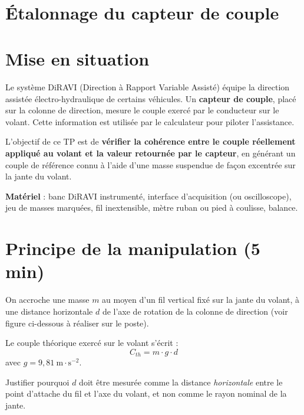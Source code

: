 



\\

\legendeniveaux


\section{Étalonnage du capteur de couple}

\section*{Mise en situation}
 
Le système DiRAVI (Direction à Rapport Variable Assisté) équipe la direction assistée électro-hydraulique de certains véhicules. Un \textbf{capteur de couple}, placé sur la colonne de direction, mesure le couple exercé par le conducteur sur le volant. Cette information est utilisée par le calculateur pour piloter l'assistance.
 
L'objectif de ce TP est de \textbf{vérifier la cohérence entre le couple réellement appliqué au volant et la valeur retournée par le capteur}, en générant un couple de référence connu à l'aide d'une masse suspendue de façon excentrée sur la jante du volant.
 
\vspace{0.5em}
\textbf{Matériel} : banc DiRAVI instrumenté, interface d'acquisition (ou oscilloscope), jeu de masses marquées, fil inextensible, mètre ruban ou pied à coulisse, balance.
 
\section{Principe de la manipulation (5 min)}
 
On accroche une masse $m$ au moyen d'un fil vertical fixé sur la jante du volant, à une distance horizontale $d$ de l'axe de rotation de la colonne de direction (voir figure ci-dessous à réaliser sur le poste).
 
Le couple théorique exercé sur le volant s'écrit :
\begin{equation}
C_{th} = m \cdot g \cdot d
\end{equation}
avec $g = 9{,}81~\text{m}\cdot\text{s}^{-2}$.
 
 Justifier pourquoi $d$ doit être mesurée comme la distance \emph{horizontale} entre le point d'attache du fil et l'axe du volant, et non comme le rayon nominal de la jante.
 
